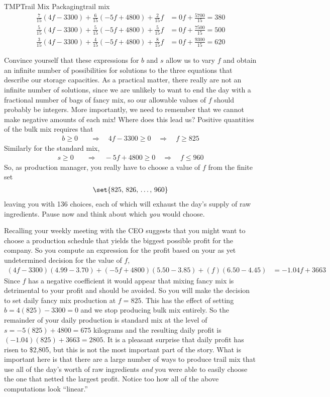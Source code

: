 \begin{example}{TMP}{Trail Mix Packaging}{trail mix}
%
\begin{align*}
\frac{7}{15}(4f-3300)+\frac{6}{15}(-5f+4800)+\frac{2}{15}f&=0f+\frac{5700}{15}=380\\
\frac{5}{15}(4f-3300)+\frac{5}{15}(-5f+4800)+\frac{5}{15}f&=0f+\frac{7500}{15}=500\\
\frac{3}{15}(4f-3300)+\frac{4}{15}(-5f+4800)+\frac{8}{15}f&=0f+\frac{9300}{15}=620
\end{align*}\par
%
Convince yourself that these expressions for $b$ and $s$ allow us to vary $f$ and obtain an infinite number of possibilities for solutions to the three equations that describe our storage capacities.  As a practical matter, there really are not an infinite number of solutions, since we are unlikely to want to end the day with a fractional number of bags of fancy mix, so our allowable values of $f$ should probably be integers.  More importantly, we need to remember that we cannot make negative amounts of each mix!  Where does this lead us?   Positive quantities of the bulk mix requires that
%
\begin{align*}
b\geq 0 
&\quad\Rightarrow\quad 4f-3300\geq 0 
\quad\Rightarrow\quad f\geq 825
\end{align*}
%
Similarly for the standard mix,
%
\begin{align*}
s\geq 0 
&\quad\Rightarrow\quad -5f+4800\geq 0 
\quad\Rightarrow\quad f\leq 960
\end{align*}
%
So, as production manager, you really have to choose a value of $f$ from the finite set \begin{align*}
\set{825,\,826,\,\ldots,\,960}
\end{align*}
leaving you with 136 choices, each of which will exhaust the day's supply of raw ingredients.  Pause now and think about which {\em you} would choose.\par
%
Recalling your weekly meeting with the CEO suggests that you might want to choose a production schedule that yields the biggest possible profit for the company.  So you compute an expression for the profit based on your as yet undetermined decision for the value of $f$,
%
\begin{align*}
(4f-3300)(4.99-3.70)+(-5f+4800)(5.50-3.85)+(f)(6.50-4.45)&=-1.04f + 3663
\end{align*}
%
Since $f$ has a negative coefficient it would appear that mixing fancy mix is detrimental to your profit and should be avoided.  So you will make the decision to set daily fancy mix production at $f=825$.  This has the effect of setting $b=4(825)-3300=0$ and we stop producing bulk mix entirely.  So the remainder of your daily production is standard mix at the level of $s=-5(825)+4800=675$ kilograms and the resulting daily profit is $(-1.04)(825)+3663=2805$.  It is a pleasant surprise that daily profit has risen to \$2,805, but this is not the most important part of the story.  What is important here is that there are a large number of ways to produce trail mix that use all of the day's worth of raw ingredients {\em and} you were able to easily choose the one that netted the largest profit.  Notice too how all of the above computations look ``linear.''\par

\end{example}
